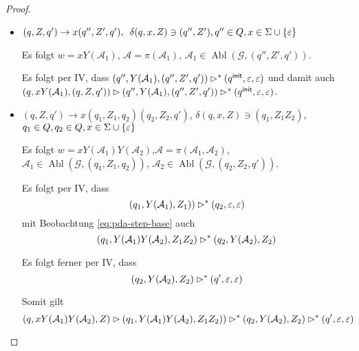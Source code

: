 {\begin{proof}
\begin{itemize}
\begin{itemize}
\begin{description}
\begin{itemize}
        \item $(q, Z, q') \to x(q'', Z', q'), \enspace \delta(q, x, Z) \ni (q'', Z'), q'' \in Q, x \in \Sigma \cup \{\varepsilon\}$

          Es folgt $w = xY(\mathcal{A}_1)$, $\mathcal{A} = \pi(\mathcal{A}_1)$, $\mathcal{A}_1 \in \operatorname{Abl}(\mathcal{G}, (q'', Z', q'))$.

          Es folgt per IV, dass $(q'', Y(\mathcal{A}_1), (q'', Z', q')) \rhd^* (q^\mathsf{init}, \varepsilon, \varepsilon)$ und damit auch $(q, xY(\mathcal{A}_1), (q, Z, q')) \rhd (q'', Y(\mathcal{A}_1), (q'', Z', q')) \rhd^* (q^\mathsf{init}, \varepsilon, \varepsilon)$.

        \item $(q, Z, q') \to x(q_1,Z_1,q_2)(q_2, Z_2, q')$, $\delta(q, x, Z) \ni (q_1, Z_1Z_2)$, $q_1 \in Q, q_2 \in Q, x \in \Sigma \cup \{\varepsilon\}$ 

          Es folgt $w = xY(\mathcal{A}_1)Y(\mathcal{A}_2)$,\enspace $\mathcal{A} = \pi(\mathcal{A}_1,\mathcal{A}_2)$,\enspace $\mathcal{A}_1 \in \operatorname{Abl}(\mathcal{G}, (q_1, Z_1, q_2))$, $\mathcal{A}_2 \in \operatorname{Abl}(\mathcal{G}, (q_2, Z_2, q'))$.

          Es folgt per IV, dass
          \begin{displaymath}
            (q_1, Y(\mathcal{A}_1), Z_1)) \rhd^* (q_2, \varepsilon, \varepsilon)
          \end{displaymath}
          mit Beobachtung \eqref{eq:pda-step-base} auch
          \begin{displaymath}
            (q_1, Y(\mathcal{A}_1)Y(\mathcal{A}_2), Z_1Z_2) \rhd^* (q_2, Y(\mathcal{A}_2), Z_2)
          \end{displaymath}

          Es folgt ferner per IV, dass
          \begin{displaymath}
            (q_2, Y(\mathcal{A}_2), Z_2) \rhd^* (q', \varepsilon, \varepsilon)
          \end{displaymath}

          Somit gilt
          \begin{displaymath}
            (q, xY(\mathcal{A}_1)Y(\mathcal{A}_2), Z) \rhd (q_1, Y(\mathcal{A}_1)Y(\mathcal{A}_2), Z_1Z_2)) \rhd^* (q_2, Y(\mathcal{A}_2), Z_2) \rhd^* (q', \varepsilon, \varepsilon)
          \end{displaymath}
          
          
        \end{itemize}
      \end{description}


\end{itemize}
\end{itemize}
\end{proof}}
